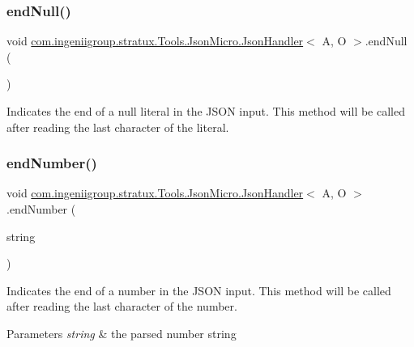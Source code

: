 \subsubsection{\texorpdfstring{end\+Null()}{endNull()}}
{\footnotesize\ttfamily void \hyperlink{classcom_1_1ingeniigroup_1_1stratux_1_1_tools_1_1_json_micro_1_1_json_handler}{com.\+ingeniigroup.\+stratux.\+Tools.\+Json\+Micro.\+Json\+Handler}$<$ A, O $>$.end\+Null (\begin{DoxyParamCaption}{ }\end{DoxyParamCaption})}

Indicates the end of a {\ttfamily null} literal in the J\+S\+ON input. This method will be called after reading the last character of the literal. \mbox{\label{classcom_1_1ingeniigroup_1_1stratux_1_1_tools_1_1_json_micro_1_1_json_handler_aa939647044a5d27c58b5a173cbab612d}} 
\subsubsection{\texorpdfstring{end\+Number()}{endNumber()}}
{\footnotesize\ttfamily void \hyperlink{classcom_1_1ingeniigroup_1_1stratux_1_1_tools_1_1_json_micro_1_1_json_handler}{com.\+ingeniigroup.\+stratux.\+Tools.\+Json\+Micro.\+Json\+Handler}$<$ A, O $>$.end\+Number (\begin{DoxyParamCaption}\item[{String}]{string }\end{DoxyParamCaption})}

Indicates the end of a number in the J\+S\+ON input. This method will be called after reading the last character of the number.


\begin{DoxyParams}{Parameters}
{\em string} & the parsed number string \\
\hline
\end{DoxyParams}
\mbox{\label{classcom_1_1ingeniigroup_1_1stratux_1_1_tools_1_1_json_micro_1_1_json_handler_a69a20ab01f45047859cc918bb04b4610}} 
